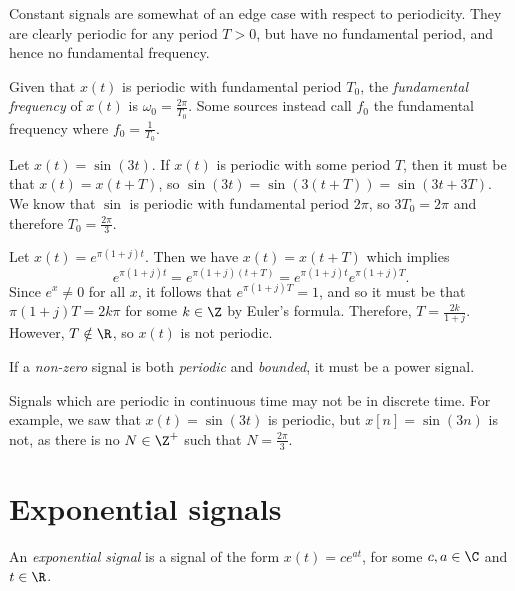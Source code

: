 \documentclass[12pt]{article}
\begin{document}
\begin{rmk}
    Constant signals are somewhat of an edge case with respect to periodicity. They are clearly periodic for any period $T > 0$, but have no fundamental period, and hence no fundamental frequency.
\end{rmk}

\begin{defn}
    Given that $x(t)$ is periodic with fundamental period $T_0$, the \emph{fundamental frequency} of $x(t)$ is $\omega_0 = \frac{2\pi}{T_0}$. Some sources instead call $f_0$ the fundamental frequency where $f_0 = \frac{1}{T_0}$.
\end{defn}

\begin{exmp}
    Let $x(t) = \sin(3t)$. If $x(t)$ is periodic with some period $T$, then it must be that $x(t) = x(t + T)$, so $\sin(3t) = \sin(3(t + T)) = \sin(3t + 3T)$. We know that $\sin$ is periodic with fundamental period $2\pi$, so $3T_0 = 2\pi$ and therefore $T_0 = \frac{2\pi}{3}$.
\end{exmp}

\begin{exmp}
    Let $x(t) = e^{\pi(1 + j)t}$. Then we have $x(t) = x(t + T)$ which implies \[e^{\pi(1 + j)t} = e^{\pi(1 + j)(t + T)} = e^{\pi(1 + j)t}e^{\pi(1 + j)T}.\] Since $e^x \neq 0$ for all $x$, it follows that $e^{\pi(1 + j)T} = 1$, and so it must be that $\pi(1 + j)T = 2k{\pi}$ for some $k \in \Z$ by Euler's formula. Therefore, $T = \frac{2k}{1 + j}$. However, $T \notin \R$, so $x(t)$ is not periodic.
\end{exmp}

\begin{rmk}
    If a \emph{non-zero} signal is both \emph{periodic} and \emph{bounded}, it must be a power signal.
\end{rmk}

\begin{rmk}
    Signals which are periodic in continuous time may not be in discrete time. For example, we saw that $x(t) = \sin(3t)$ is periodic, but $x[n] = \sin(3n)$ is not, as there is no $N \in \Z^+$ such that $N = \frac{2\pi}{3}$.
\end{rmk}

\section{Exponential signals}

\begin{defn}
    An \emph{exponential signal} is a signal of the form $x(t) = ce^{at}$, for some $c, a \in \C$ and $t \in \R$.
\end{defn}
\end{document}
